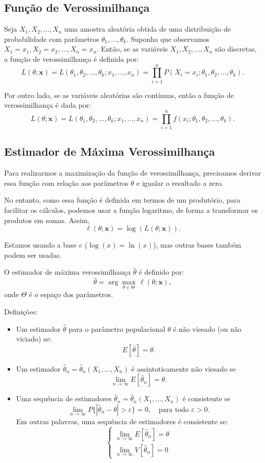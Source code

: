 \documentclass{article}
\begin{document}
\subsection{Função de Verossimilhança}
Seja $X_1, X_2, \ldots, X_n$ uma amostra aleatória obtida de uma distribuição de probabilidade com parâmetros $\theta_1, \ldots, \theta_k$. 
Suponha que observamos $X_1 = x_1, X_2 = x_2, \ldots, X_n = x_n$. 
Então, se as variáveis $X_1, X_2, \ldots, X_n$ são discretas, a função de verossimilhança é definida por:
    $$
    L(\theta; \mathbf{x}) = L(\theta_1, \theta_2, \ldots, \theta_k; x_1, \ldots, x_n) 
    = \prod_{i=1}^n P(X_i = x_i; \theta_1, \theta_2, \ldots, \theta_k).
    $$

Por outro lado, se as variáveis aleatórias são contínuas, então a função de verossimilhança é dada por:
    $$
    L(\theta; \mathbf{x}) = L(\theta_1, \theta_2, \ldots, \theta_k; x_1, \ldots, x_n) 
    = \prod_{i=1}^n f(x_i; \theta_1, \theta_2, \ldots, \theta_k).
    $$

\subsection{Estimador de Máxima Verossimilhança}
Para realizarmos a maximização da função de verossimilhança, precisamos derivar essa função com relação aos parâmetros $\theta$ e igualar o resultado a zero.
    
No entanto, como essa função é definida em termos de um produtório, para facilitar os cálculos, podemos usar a função logaritmo, de forma a transformar os produtos em somas. Assim,   
    $$
    \ell(\theta; \mathbf{x}) = \log \left( L(\theta; \mathbf{x}) \right).
    $$
    
Estamos usando a base $e$ ($\log(x) = \ln(x)$), mas outras bases também podem ser usadas.

O estimador de máxima verossimilhança $\hat{\theta}$ é definido por:
    $$
    \hat{\theta} = \arg\max_{\theta \in \Theta} \, \ell(\theta; \mathbf{x}),
    $$
onde $\Theta$ é o espaço dos parâmetros.

Definições:
\begin{itemize}
    \item Um estimador $\hat{\theta}$ para o parâmetro populacional $\theta$ é não viesado (ou não viciado) se:
        $$
        E[\hat{\theta}] = \theta.
        $$
    \item Um estimador $\hat{\theta}_n = \hat{\theta}_n(X_1, \ldots, X_n)$ é assintoticamente não viesado se
        $$
        \lim_{n \to \infty} E[\hat{\theta}_n] = \theta.
        $$
    \item Uma sequência de estimadores $\hat{\theta}_n = \hat{\theta}_n(X_1, \ldots, X_n)$ é consistente se
        $$
        \lim_{n \to \infty} P\{|\hat{\theta}_n - \theta| > \varepsilon\} = 0,
        \quad \text{para todo } \varepsilon > 0.
        $$
    Em outras palavras, uma sequência de estimadores é consistente se:
        $$
        \begin{cases}
        \lim_{n \to \infty} E[\hat{\theta}_n] = \theta \\
        \lim_{n \to \infty} V[\hat{\theta}_n] = 0
        \end{cases}
        $$
\end{itemize}
\end{document}
